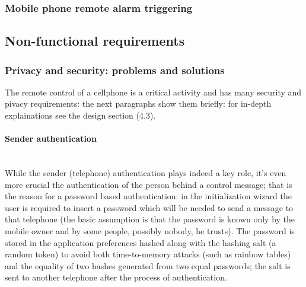 \documentclass[a4paper,12pt]{article}
\begin{document}
\subsubsection{Mobile phone remote alarm triggering}
\subsection{Non-functional requirements}
\subsubsection{Privacy and security: problems and solutions}
\small{The remote control of a cellphone is a critical activity and has many security and pivacy requirements: the next paragraphs show them briefly: for in-depth explainations see the design section (4.3).}
\vspace{10pt}
\paragraph{Sender authentication} \hspace{0pt} \\
\small{While the sender (telephone) authentication plays indeed a key role, it's even more crucial the authentication of the person behind a control message; that is the reason for a password based authentication: in the initialization wizard the user is required to insert a password which will be needed to send a message to that telephone (the basic assumption is that the password is known only by the mobile owner and by some people, possibly nobody, he trusts). The password is stored in the application preferences hashed along with the hashing salt (a random token) to avoid both time-to-memory attacks (such as rainbow tables) and the equality of two hashes generated from two equal passwords; the salt is sent to another telephone after the process of authentication.}
\end{document}
